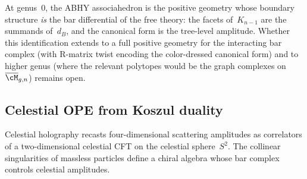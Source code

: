 \begin{remark}
At genus~$0$, the ABHY associahedron is the positive
geometry whose boundary structure \emph{is} the bar
differential of the free theory: the facets of~$K_{n-1}$
are the summands of~$d_B$, and the canonical form is the
tree-level amplitude.
Whether this identification extends to a full positive
geometry for the interacting bar complex (with R-matrix
twist encoding the color-dressed canonical form) and to
higher genus (where the relevant polytopes would be
the graph complexes on $\overline{\cM}_{g,n}$) remains
open.
\end{remark}

%
%

\subsection{Celestial OPE from Koszul duality}
\label{subsec:frontier-celestial}

Celestial holography recasts four-dimensional scattering
amplitudes as correlators of a two-dimensional celestial
CFT on the celestial sphere~$S^2$. The collinear
singularities of massless particles define a chiral algebra
whose bar complex controls celestial amplitudes.

